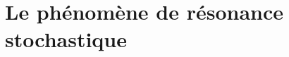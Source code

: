 \documentclass[openany,a4paper,12pt]{article}
\begin{document}
%            



\section{Le phénomène de résonance stochastique}
















%



\newpage
\printbibliography
\end{document}

